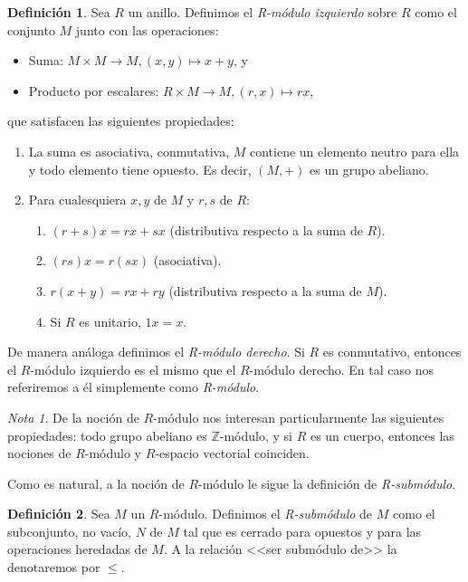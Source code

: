 \documentclass[12pt, a4paper, twoside]{book}
\numberwithin{equation}{section}
\theoremstyle{definition}
\newtheorem{defi}{Definición}[section]
\theoremstyle{remark}
\newtheorem*{remark}{Nota}
\theoremstyle{plain}
\begin{document}
	\begin{defi}
		Sea $R$ un anillo. Definimos el \textit{R-módulo izquierdo} 
		sobre
		$R$ como el conjunto $M$ junto con las operaciones:
		\begin{itemize}
			\item Suma: $M \times M \rightarrow M, (x,y) \mapsto 
				x+y$, y
			\item Producto por escalares: $R \times M \rightarrow 
				M, (r,x) \mapsto rx$,	
		\end{itemize}
		que satisfacen las siguientes propiedades:
		\begin{enumerate}
			\item La suma es asociativa, conmutativa, $M$ contiene
			      un elemento neutro para ella y todo elemento 
			      tiene opuesto. Es decir, $(M,+)$ es un grupo 
			      abeliano.
		      \item Para cualesquiera $x,y$ de $M$ y $r,s$ de $R$: 
		      	\begin{enumerate}
			 	\item $(r+s)x=rx+sx$ (distributiva respecto a 
					la suma de $R$).
				\item $(rs)x=r(sx)$ (asociativa).
				\item $r(x+y)=rx+ry$ (distributiva respecto a 
					la suma de $M$).
				\item Si $R$ es unitario, $1x=x$.	
			\end{enumerate}
		\end{enumerate}
		De manera análoga definimos el \textit{R-módulo derecho}. Si 
		$R$ es conmutativo, entonces el $R$-módulo izquierdo es el 
		mismo que el $R$-módulo derecho. En tal caso nos referiremos a
		él simplemente como \textit{R-módulo}.
	\end{defi}

	\begin{remark}
	De la noción de $R$-módulo nos interesan particularmente las 
	siguientes propiedades: todo grupo abeliano es $\mathbb{Z}$-módulo, y
	si $R$ es un cuerpo, entonces las nociones de $R$-módulo y $R$-espacio
	vectorial coinciden.
	\end{remark}

	Como es natural, a la noción de $R$-módulo le sigue la definición de
	\emph{R-submódulo}.

	\begin{defi}
	Sea $M$ un $R$-módulo. Definimos el \textit{R-submódulo} de $M$ como 
	el subconjunto, no vacío, $N$ de $M$ tal que es cerrado para opuestos 
	y para las operaciones heredadas de $M$. A la relación <<ser submódulo 
	de>> la denotaremos por $\leq$.
	\end{defi}
\end{document}
